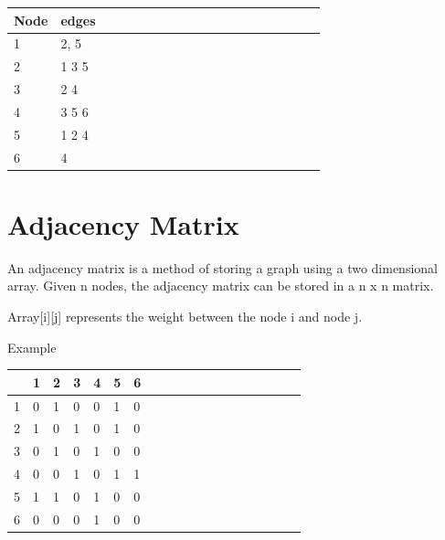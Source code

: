 \documentclass[11pt,oneside]{book}
\begin{document}
\vspace{10px}\begin{tabulary}{0.4\linewidth}{|l|l|l|l|l|l|l|l|l|l|l|l|l|l|l|l|l|l|l}\hline


  Node &
  edges\\
\hline


  1 &
  2, 5\\

  2 &
  1 3 5\\

  3 &
  2 4\\

  4 &
  3 5 6\\

  5 &
  1 2 4\\

  6 &
  4\\

\hline\end{tabulary}



        \section{ Adjacency Matrix }
        

An adjacency matrix is a method of storing a graph using a two dimensional array. Given n nodes, the adjacency matrix can be stored in a n x n matrix.

Array[i][j] represents the weight between the node i and node j.

Example

\vspace{10px}\begin{tabulary}{0.4\linewidth}{|l|l|l|l|l|l|l|l|l|l|l|l|l|l|l|l|l|l|l}\hline


   &
  1 &
  2 &
  3 &
  4 &
  5 &
  6\\
\hline


  1 &
  0 &
  1 &
  0 &
  0 &
  1 &
  0\\

  2 &
  1 &
  0 &
  1 &
  0 &
  1 &
  0\\

  3 &
  0 &
  1 &
  0 &
  1 &
  0 &
  0\\

  4 &
  0 &
  0 &
  1 &
  0 &
  1 &
  1\\

  5 &
  1 &
  1 &
  0 &
  1 &
  0 &
  0\\

  6 &
  0 &
  0 &
  0 &
  1 &
  0 &
  0\\

\hline\end{tabulary}
\end{document}
